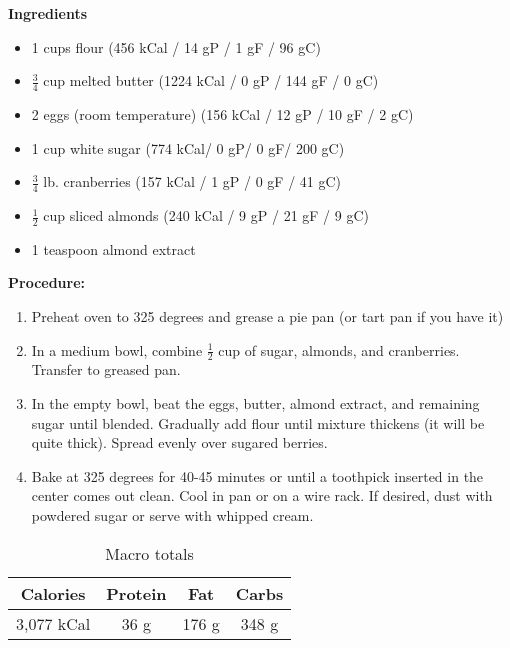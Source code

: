 \begin{multicols}{2}
\textbf{Ingredients}
\begin{itemize}
\item 1 cups flour \quad (456 kCal / 14 gP / 1 gF / 96 gC)
\item $\frac{3}{4}$ cup melted butter \quad (1224 kCal / 0 gP / 144 gF / 0 gC)
\item 2 eggs (room temperature)  \quad \newline (156 kCal / 12 gP / 10 gF / 2 gC)
\item 1 cup white sugar (774 kCal/ 0 gP/ 0 gF/ 200 gC)
\item $\frac{3}{4}$ lb. cranberries \quad (157 kCal / 1 gP / 0 gF / 41 gC)
\item $\frac{1}{2}$ cup sliced almonds \quad \newline(240 kCal / 9 gP / 21 gF / 9 gC)
\item 1 teaspoon almond extract 




\end{itemize}


\columnbreak
\textbf{Procedure:}
\medskip


\begin{enumerate}
\item Preheat oven to 325 degrees and grease a pie pan (or tart pan if you have it)


\medskip
\item In a medium bowl, combine $\frac{1}{2}$ cup of sugar, almonds, and cranberries. Transfer to greased pan.  
\medskip

\item In the empty bowl, beat the eggs, butter, almond extract, and remaining sugar until blended. Gradually add flour until mixture thickens (it will be quite thick). Spread evenly over sugared berries. 
\newline 

 \item Bake at 325 degrees for 40-45 minutes or until a toothpick inserted in the center comes out clean. Cool in pan or on a wire rack. If desired, dust with powdered sugar or serve with whipped cream. 
\end{enumerate}
\begin{table}[H]
  \begin{center}
    \caption{Macro totals}
    \label{tab:table1}
    \begin{tabular}{c|c|c|c} %
      \textbf{Calories} & \textbf{Protein} & \textbf{Fat} & \textbf{Carbs}\\
      \hline
      3,077 kCal & 36 g & 176 g & 348 g\\
    \end{tabular}
  \end{center}
\end{table}
\end{multicols}
